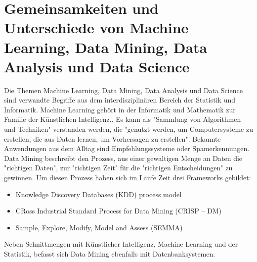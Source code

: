\section{Gemeinsamkeiten und Unterschiede von Machine Learning, Data Mining, Data Analysis und Data Science}\label{sec:DataMining}
Die Themen Machine Learning, Data Mining, Data Analysis und Data Science sind verwandte Begriffe aus dem interdisziplinären Bereich der Statistik und Informatik.  \newline
Machine Learning gehört in der Informatik und Mathematik zur Familie der Künstlichen Intelligenz.. Es kann als "Sammlung von Algorithmen und Techniken" verstanden werden, die "genutzt werden, um Computersysteme zu erstellen, die aus Daten lernen, um Vorhersagen zu erstellen".\citep[S.~53; eigene Übersetzung]{swamynathan_mastering_2017} Bekannte Anwendungen aus dem Alltag sind Empfehlungssysteme oder Spamerkennungen.\citep[S.~53]{swamynathan_mastering_2017}\newline
Data Mining beschreibt den Prozess, aus einer gewaltigen Menge an Daten die "richtigen Daten", zur "richtigen Zeit" für die "richtigen Entscheidungen"\citep[S.~61; eigene Übersetzung]{swamynathan_mastering_2017} zu gewinnen. Um diesen Prozess haben sich im Laufe Zeit drei Frameworks gebildet\citep[S.~69]{swamynathan_mastering_2017}:
\begin{itemize}
\item Knowledge Discovery Databases (KDD) process model
\item CRoss Industrial Standard Process for Data Mining (CRISP – DM)
\item Sample, Explore, Modify, Model and Assess (SEMMA)
\end{itemize}
Neben Schnittmengen mit Künstlicher Intelligenz, Machine Learning und der Statistik, befasst sich Data Mining ebenfalls mit Datenbanksystemen.\citep[S.~4]{ramasubramanian_machine_2017}

